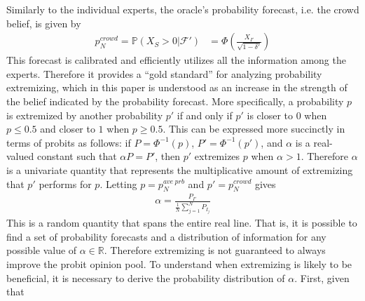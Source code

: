 \documentclass[11pt]{article}
\renewcommand{\P}{\mathbb{P}}
\theoremstyle{definition}
\theoremstyle{definition}
\begin{document}
Similarly to the individual experts, the oracle's probability forecast, i.e. the crowd belief, is given by 
 \begin{align}
p^{crowd}_N = \P(X_S > 0 |  \mathcal{F}') &= \Phi\left( \frac{X_{I'}}{\sqrt{1-\delta'}} \right)
\end{align}
This forecast is calibrated and efficiently utilizes all the information among the experts. Therefore it provides a ``gold standard'' for analyzing probability extremizing, which in this paper  is understood as an increase in the strength of the belief indicated by the probability forecast. More specifically, a probability $p$ is extremized by another probability $p'$ if and only if $p'$ is closer to $0$ when $p \leq 0.5$ and closer to $1$ when $p \geq 0.5$. This can be expressed more succinctly in terms of probits as follows: if $P = \Phi^{-1}(p)$, $P' = \Phi^{-1}(p')$, and $\alpha$ is a real-valued constant such that $\alpha P = P'$, then $p'$ extremizes $p$ when $\alpha > 1$. Therefore $\alpha$ is a univariate quantity that represents the multiplicative amount of extremizing that $p'$ performs for $p$. Letting $p= p_{N}^{ave\ prb}$ and $p' = p_N^{crowd}$ gives
\begin{align}
\alpha  = \frac{P_{I'}}{\frac{1}{N}\sum_{j=1}^N P_{I_j}}\label{alpha}
\end{align}
This is a random quantity that spans the entire real line. That is, it is possible to find a set of probability forecasts and a distribution of information for any possible value of $\alpha \in \mathbb{R}$. Therefore extremizing is not guaranteed to always improve the probit opinion pool. To understand when extremizing is likely to be beneficial, it is necessary to derive the probability distribution of $\alpha$. First, given that 
\end{document}
